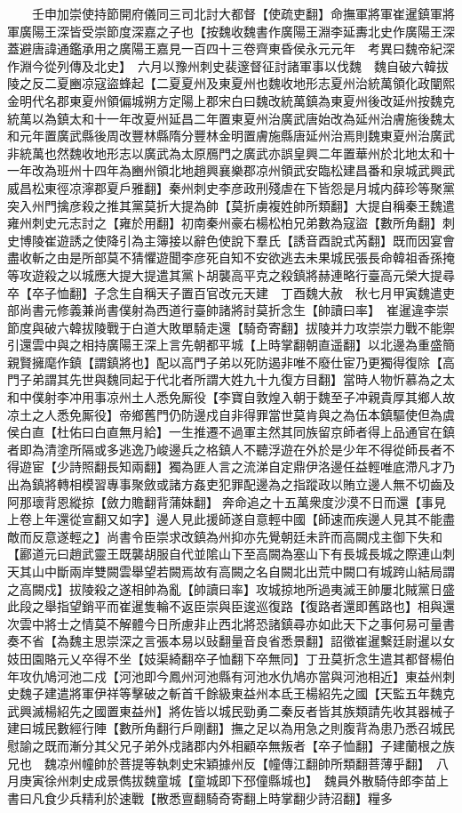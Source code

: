 　　壬申加崇使持節開府儀同三司北討大都督【使疏吏翻】命撫軍將軍崔暹鎮軍將軍廣陽王深皆受崇節度深嘉之子也【按魏收魏書作廣陽王淵李延夀北史作廣陽王深蓋避唐諱通鑑承用之廣陽王嘉見一百四十三卷齊東昏侯永元元年　考異曰魏帝紀深作淵今從列傳及北史】　六月以豫州刺史裴邃督征討諸軍事以伐魏　魏自破六韓拔陵之反二夏豳凉寇盜蜂起【二夏夏州及東夏州也魏收地形志夏州治統萬領化政闡熙金明代名郡東夏州領偏城朔方定陽上郡宋白曰魏改統萬鎮為東夏州後改延州按魏克統萬以為鎮太和十一年改夏州延昌二年置東夏州治廣武唐始改為延州治膚施後魏太和元年置廣武縣後周改豐林縣隋分豐林金明置膚施縣唐延州治焉則魏東夏州治廣武非統萬也然魏收地形志以廣武為太原鴈門之廣武亦誤皇興二年置華州於北地太和十一年改為班州十四年為豳州領北地趙興襄樂郡凉州領武安臨松建昌番和泉城武興武威昌松東徑凉濘郡夏戶雅翻】秦州刺史李彦政刑殘虐在下皆怨是月城内薛珍等聚黨突入州門擒彦殺之推其黨莫折大提為帥【莫折虜複姓帥所類翻】大提自稱秦王魏遣雍州刺史元志討之【雍於用翻】初南秦州豪右楊松柏兄弟數為寇盜【數所角翻】刺史博陵崔遊誘之使降引為主簿接以辭色使說下羣氏【誘音酉說式芮翻】既而因宴會盡收斬之由是所部莫不猜懼遊聞李彦死自知不安欲逃去未果城民張長命韓祖香孫掩等攻遊殺之以城應大提大提遣其黨卜胡襲高平克之殺鎮將赫連略行臺高元榮大提尋卒【卒子恤翻】子念生自稱天子置百官改元天建　丁酉魏大赦　秋七月甲寅魏遣吏部尚書元修義兼尚書僕射為西道行臺帥諸將討莫折念生【帥讀曰率】　崔暹違李崇節度與破六韓拔陵戰于白道大敗單騎走還【騎奇寄翻】拔陵并力攻崇崇力戰不能禦引還雲中與之相持廣陽王深上言先朝都平城【上時掌翻朝直遥翻】以北邊為重盛簡親賢擁麾作鎮【謂鎮將也】配以高門子弟以死防遏非唯不廢仕宦乃更獨得復除【高門子弟謂其先世與魏同起于代北者所謂大姓九十九復方目翻】當時人物忻慕為之太和中僕射李冲用事凉州土人悉免厮役【李寶自敦煌入朝于魏至子冲親貴厚其鄉人故凉土之人悉免厮役】帝鄉舊門仍防邊戍自非得罪當世莫肯與之為伍本鎮驅使但為虞侯白直【杜佑曰白直無月給】一生推遷不過軍主然其同族留京師者得上品通官在鎮者即為清塗所隔或多逃逸乃峻邊兵之格鎮人不聽浮遊在外於是少年不得從師長者不得遊宦【少詩照翻長知兩翻】獨為匪人言之流涕自定鼎伊洛邊任益輕唯底滯凡才乃出為鎮將轉相模習專事聚斂或諸方姦吏犯罪配邊為之指蹤政以賄立邊人無不切齒及阿那瓌背恩縱掠【斂力贍翻背蒲妹翻】奔命追之十五萬衆度沙漠不日而還【事見上卷上年還從宣翻又如字】邊人見此援師遂自意輕中國【師速而疾邊人見其不能盡敵而反意遂輕之】尚書令臣崇求改鎮為州抑亦先覺朝廷未許而高闕戍主御下失和【酈道元曰趙武靈王既襲胡服自代並隂山下至高闕為塞山下有長城長城之際連山刺天其山中斷兩岸雙闕雲舉望若闕焉故有高闕之名自闕北出荒中闕口有城跨山結局謂之高闕戍】拔陵殺之遂相帥為亂【帥讀曰率】攻城掠地所過夷滅王帥屢北賊黨日盛此段之舉指望銷平而崔暹隻輪不返臣崇與臣逡巡復路【復路者還即舊路也】相與還次雲中將士之情莫不解體今日所慮非止西北將恐諸鎮尋亦如此天下之事何易可量書奏不省【為魏主思崇深之言張本易以䜴翻量音良省悉景翻】詔徵崔暹繫廷尉暹以女妓田園賂元乂卒得不坐【妓渠綺翻卒子恤翻下卒無同】丁丑莫折念生遣其都督楊伯年攻仇鳩河池二戍【河池即今鳳州河池縣有河池水仇鳩亦當與河池相近】東益州刺史魏子建遣將軍伊祥等擊破之斬首千餘級東益州本氐王楊紹先之國【天監五年魏克武興滅楊紹先之國置東益州】將佐皆以城民勁勇二秦反者皆其族類請先收其器械子建曰城民數經行陣【數所角翻行戶剛翻】撫之足以為用急之則腹背為患乃悉召城民慰諭之既而漸分其父兄子弟外戍諸郡内外相顧卒無叛者【卒子恤翻】子建蘭根之族兄也　魏凉州幢帥於菩提等執刺史宋穎據州反【幢傳江翻帥所類翻菩薄乎翻】　八月庚寅徐州刺史成景儁拔魏童城【童城即下邳僮縣城也】　魏員外散騎侍郎李苗上書曰凡食少兵精利於速戰【散悉亶翻騎奇寄翻上時掌翻少詩沼翻】糧多